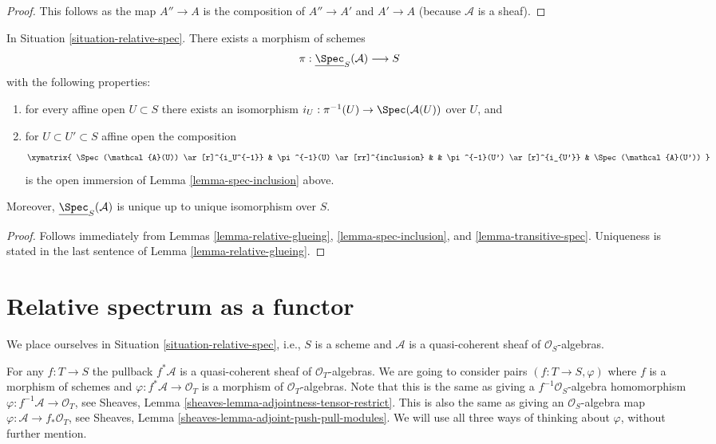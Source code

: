 \begin{proof}
This follows as the map $A'' \to A$ is the composition of $A'' \to A'$ and
$A' \to A$ (because $\mathcal{A}$ is a sheaf).
\end{proof}

\begin{lemma}
\label{lemma-glue-relative-spec}
In Situation \ref{situation-relative-spec}.
There exists a morphism of schemes
$$
\pi : \underline{\Spec}_S(\mathcal{A}) \longrightarrow S
$$
with the following properties:
\begin{enumerate}
\item for every affine open $U \subset S$ there exists an isomorphism
$i_U : \pi^{-1}(U) \to \Spec(\mathcal{A}(U))$ over $U$, and
\item for $U \subset U' \subset S$ affine open the composition
$$
\xymatrix{
\Spec(\mathcal{A}(U)) \ar[r]^{i_U^{-1}} &
\pi^{-1}(U) \ar[rr]^{inclusion} & &
\pi^{-1}(U') \ar[r]^{i_{U'}} &
\Spec(\mathcal{A}(U'))
}
$$
is the open immersion of Lemma \ref{lemma-spec-inclusion} above.
\end{enumerate}
Moreover, $\underline{\Spec}_S(\mathcal{A})$
is unique up to unique isomorphism over $S$.
\end{lemma}

\begin{proof}
Follows immediately from
Lemmas \ref{lemma-relative-glueing},
\ref{lemma-spec-inclusion}, and
\ref{lemma-transitive-spec}.
Uniqueness is stated in the last sentence of
Lemma \ref{lemma-relative-glueing}.
\end{proof}












\section{Relative spectrum as a functor}
\label{section-spec}

\noindent
We place ourselves in Situation \ref{situation-relative-spec}, i.e.,
$S$ is a scheme and $\mathcal{A}$ is a quasi-coherent sheaf of
$\mathcal{O}_S$-algebras.

\medskip\noindent
For any $f : T \to S$ the pullback
$f^*\mathcal{A}$ is a quasi-coherent sheaf of $\mathcal{O}_T$-algebras.
We are going to consider pairs $(f : T \to S, \varphi)$ where
$f$ is a morphism of schemes and $\varphi : f^*\mathcal{A} \to \mathcal{O}_T$
is a morphism of $\mathcal{O}_T$-algebras. Note that this is the
same as giving a $f^{-1}\mathcal{O}_S$-algebra homomorphism
$\varphi : f^{-1}\mathcal{A} \to \mathcal{O}_T$, see
Sheaves, Lemma \ref{sheaves-lemma-adjointness-tensor-restrict}.
This is also the same as giving an $\mathcal{O}_S$-algebra map
$\varphi : \mathcal{A} \to f_*\mathcal{O}_T$, see
Sheaves, Lemma \ref{sheaves-lemma-adjoint-push-pull-modules}.
We will use all three ways of thinking about $\varphi$,
without further mention.

